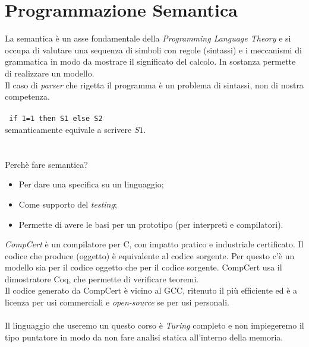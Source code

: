 \documentclass[10pt,                    %
               a4paper,                 %
               twoside,                 %
               openright,               %
               english,                 
               italian,                 
               ]{book}
\begin{document}
\chapter{Programmazione Semantica}
La semantica \`e un asse fondamentale della \textit{Programming Language Theory} e si occupa di valutare una sequenza di simboli con regole (sintassi) e i meccanismi di grammatica in modo da mostrare il significato del calcolo. In sostanza permette di realizzare un modello.\\
Il caso di \textit{parser} che rigetta il programma \`e un problema di sintassi, non di nostra competenza.\\\\
\noindent
\verb! if 1=1 then S1 else S2!\\
semanticamente equivale a scrivere $S1$.\\\\\\
Perch\`e fare semantica?
\begin{itemize}
\item Per dare una specifica su un linguaggio;
\item Come supporto del \textit{testing};
\item Permette di avere le basi per un prototipo (per interpreti e compilatori).
\end{itemize}
\noindent
\textit{CompCert} \`e un compilatore per C, con impatto pratico e industriale certificato. Il codice che produce (oggetto) \`e equivalente al codice sorgente. Per questo c'\`e un modello sia per il codice oggetto che per il codice sorgente. CompCert usa il dimostratore Coq, che permette di verificare teoremi.\\
Il codice generato da CompCert \`e vicino al GCC, ritenuto il pi\`u efficiente ed \`e a licenza per usi commerciali e \textit{open-source} se per usi personali.\\\\
Il linguaggio che useremo un questo corso \`e \textit{Turing} completo e non impiegeremo il tipo puntatore in modo da non fare analisi statica all'interno della memoria.\\\\
\end{document}
